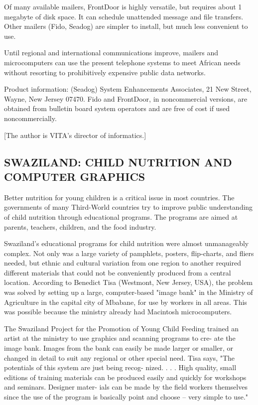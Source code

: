 Of many available mailers, FrontDoor is highly versatile, but requires
about 1 megabyte of disk space. It can schedule unattended message and
file transfers. Other mailers (Fido, Seadog) are simpler to install, but
much less convenient to use.
 
Until regional and international communications improve, mailers and
microcomputers can use the present telephone systems to meet African
needs without resorting to prohibitively expensive public data networks.
 
Product information: (Seadog) System Enhancements Associates, 21 New
Street, Wayne, New Jersey 07470. Fido and FrontDoor, in noncommercial
versions, are obtained from bulletin board system operators and are free
of cost if used noncommercially.

[The author is VITA's director of informatics.]

\subsection{SWAZILAND: CHILD NUTRITION AND COMPUTER GRAPHICS}
 Better nutrition for young children is a critical issue in most
countries. The governments of many Third-World countries try to improve 
public understanding of child nutrition through educational programs.
The programs are aimed at parents, teachers, children, and the food
industry.
 
Swaziland's educational programs for child nutrition were almost
unmanageably complex. Not only was a large variety of pamphlets, posters, 
flip-charts, and fliers needed, but ethnic and cultural variation from
one region to another required different materials that could not be
conveniently produced from a central location. According to Benedict
Tisa (Westmont, New Jersey, USA), the problem was solved by setting up a
large, computer-based "image bank" in the Ministry of Agriculture in the
capital city of Mbabane, for use by workers in all areas. This was
possible because the ministry already had Macintosh microcomputers. 
 
The Swaziland Project for the Promotion of Young Child Feeding trained
an artist at the ministry to use graphics and scanning programs to cre-
ate the image bank. Images from the bank can easily be made larger or
smaller, or changed in detail to suit any regional or other special
need. Tisa says, "The potentials of this system are just being recog-
nized. . . . High quality, small editions of training materials can be
produced easily and quickly for workshops and seminars. Designer mater-
ials can be made by the field workers themselves since the use of the
program is basically point and choose -- very simple to use."
 
